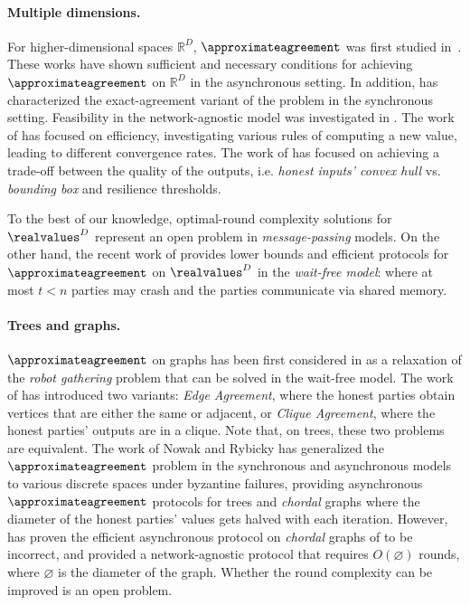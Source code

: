 \paragraph{Multiple dimensions.} 
For higher-dimensional spaces $\mathbb{R}^D$, $\approximateagreement$ was first studied in~\cite{PODC:VaiGar13, STOC:MenHer13,DIST:MHVG15}.
These works have shown sufficient and necessary conditions for achieving $\approximateagreement$ on $\mathbb{R}^D$ in the asynchronous setting. In addition, \cite{PODC:VaiGar13} has characterized the exact-agreement variant of the problem in the synchronous setting. Feasibility in the network-agnostic model was investigated in \cite{SPAA:GhLiWa23}. The work of \cite{DISC:FugNow18} has focused on efficiency, investigating various rules of computing a new value, leading to different convergence rates. 
The work of \cite{ARXIV:CamMel23} has focused on achieving a trade-off between the quality of the outputs, i.e. \emph{honest inputs' convex hull} vs. \emph{bounding box} and resilience thresholds.

To the best of our knowledge, optimal-round complexity solutions for $\realvalues^D$ represent an open problem in \emph{message-passing} models. On the other hand, the recent work of \cite{OPODIS:AttEll22} provides lower bounds and efficient protocols for $\approximateagreement$ on $\realvalues^D$ in the \emph{wait-free model}: where at most $t < n$ parties may crash and the parties communicate via shared memory.


\paragraph{Trees and graphs.} $\approximateagreement$ on graphs has been first considered in \cite{DISC:ACFR19}  as a relaxation of the \emph{robot gathering} problem \cite{GatheringRing, GatheringBipartite} that can be solved in the wait-free model. The work of \cite{DISC:ACFR19} has introduced two variants: \emph{Edge Agreement}, where the honest parties obtain vertices that are either the same or adjacent, or \emph{Clique Agreement}, where the honest parties' outputs are in a clique. Note that, on trees, these two problems are equivalent. The work of Nowak and Rybicky \cite{DISC:NoRy19} has generalized the $\approximateagreement$ problem in the synchronous and asynchronous models to various discrete spaces under byzantine failures, providing asynchronous $\approximateagreement$ protocols for trees and \emph{chordal} graphs where the diameter of the honest parties' values gets halved with each iteration. However, \cite{eprint:ConvexWorld} has proven the efficient asynchronous protocol on \emph{chordal} graphs of \cite{DISC:NoRy19} to be incorrect, and provided a network-agnostic protocol that requires $O(\diameter)$ rounds, where $\diameter$ is the diameter of the graph. Whether the round complexity can be improved is an open problem.

